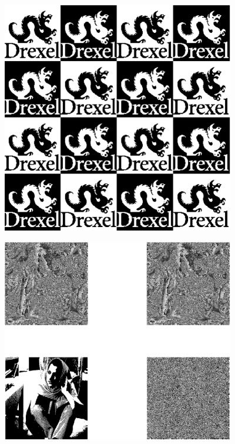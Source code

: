 \documentclass{article}
\begin{document}
\includegraphics [width=4in]{lab3_07.eps}

\includegraphics [width=4in]{lab3_08.eps}
\end{document}
